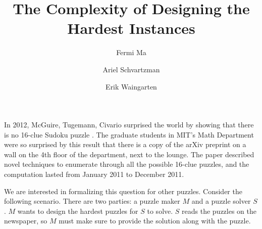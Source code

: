 \documentclass[runningheads,a4paper]{llncs}
\begin{document}
\mainmatter  %

\title{The Complexity of Designing the Hardest Instances}


%
%
\author{Fermi Ma \and Ariel Schvartzman \and Erik Waingarten}
%


%
%

\maketitle

In 2012, McGuire, Tugemann, Civario surprised the world by showing that there is no 16-clue Sudoku puzzle \cite{mcguire2012there}. The graduate students in MIT's Math Department were so surprised by this result that there is a copy of the arXiv preprint on a wall on the 4th floor of the department, next to the lounge. The paper described novel techniques to enumerate through all the possible 16-clue puzzles, and the computation lasted from January 2011 to December 2011. 

We are interested in formalizing this question for other puzzles. Consider the following scenario. There are two parties: a puzzle maker $M$ and a puzzle solver $S$. $M$ wants to design the hardest puzzles for $S$ to solve. $S$ reads the puzzles on the newspaper, so $M$ must make sure to provide the solution along with the puzzle. 
\end{document}
